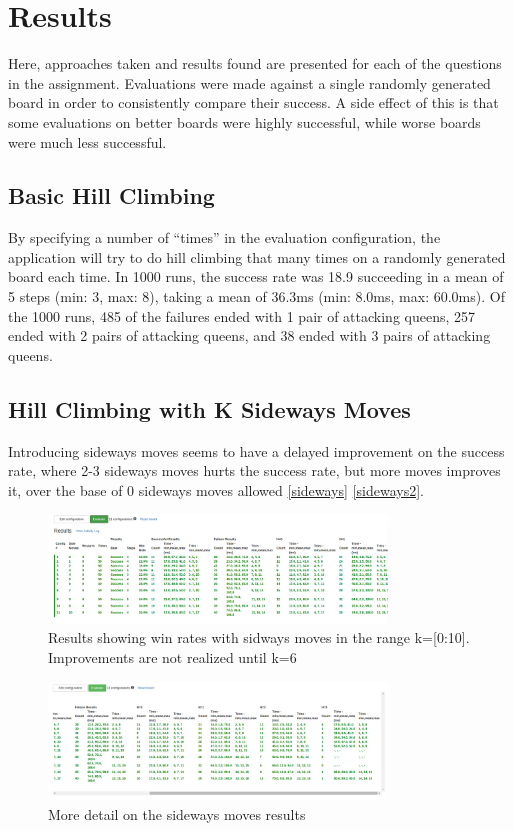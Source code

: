 \section{Results}
\label{section:results}
Here, approaches taken and results found are presented for each of the questions in the assignment. Evaluations were
made against a single randomly generated board in order to consistently compare their success. A side effect of this
is that some evaluations on better boards were highly successful, while worse boards were much less successful.

\subsection{Basic Hill Climbing}
By specifying a number of ``times'' in the evaluation configuration, the application will try to do hill climbing that
many times on a randomly generated board each time. In 1000 runs, the success rate was 18.9%
succeeding in a mean of 5 steps (min: 3, max: 8), taking a mean of 36.3ms (min: 8.0ms, max: 60.0ms). Of the 1000 runs,
485 of the failures ended with 1 pair of attacking queens, 257 ended with 2 pairs of attacking queens, and 38 ended with
3 pairs of attacking queens.

\subsection{Hill Climbing with K Sideways Moves}
Introducing sideways moves seems to have a delayed improvement on the success rate, where 2-3 sideways moves hurts the
success rate, but more moves improves it, over the base of 0 sideways moves allowed \ref{sideways} \ref{sideways2}.

\begin{figure}[ht!]
\centering
\includegraphics[width=90mm]{img/sideways.png}
\caption{Results showing win rates with sidways moves in the range k=[0:10]. Improvements are not realized until k=6}
\label{fig:ui}
\end{figure}

\begin{figure}[ht!]
\centering
\includegraphics[width=90mm]{img/sideways2.png}
\caption{More detail on the sideways moves results}
\label{fig:ui}
\end{figure}


